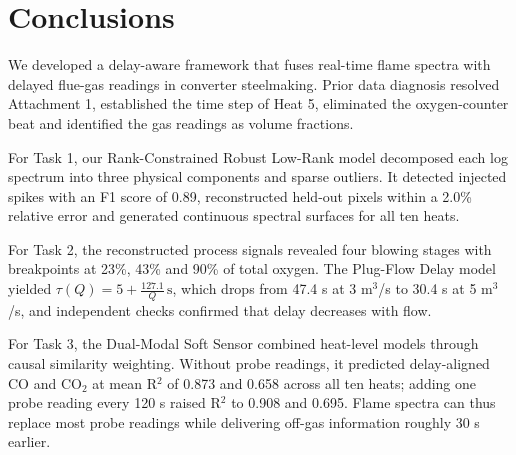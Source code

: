 \FloatBarrier
\section{Conclusions}\label{sec:10}

We developed a delay-aware framework that fuses real-time flame spectra with delayed flue-gas readings in converter steelmaking. Prior data diagnosis resolved Attachment 1, established the time step of Heat 5, eliminated the oxygen-counter beat and identified the gas readings as volume fractions.

For Task 1, our Rank-Constrained Robust Low-Rank model decomposed each log spectrum into three physical components and sparse outliers. It detected injected spikes with an F1 score of 0.89, reconstructed held-out pixels within a 2.0\% relative error and generated continuous spectral surfaces for all ten heats.

For Task 2, the reconstructed process signals revealed four blowing stages with breakpoints at 23\%, 43\% and 90\% of total oxygen. The Plug-Flow Delay model yielded $\tau(Q) = 5 + \frac{127.1}{Q}\,\mathrm{s}$, which drops from 47.4 s at 3 m\ensuremath{^{3}}/s to 30.4 s at 5 m\ensuremath{^{3}}/s, and independent checks confirmed that delay decreases with flow.

For Task 3, the Dual-Modal Soft Sensor combined heat-level models through causal similarity weighting. Without probe readings, it predicted delay-aligned CO and CO\ensuremath{_{2}} at mean R\ensuremath{^{2}} of 0.873 and 0.658 across all ten heats; adding one probe reading every 120 s raised R\ensuremath{^{2}} to 0.908 and 0.695. Flame spectra can thus replace most probe readings while delivering off-gas information roughly 30 s earlier.


